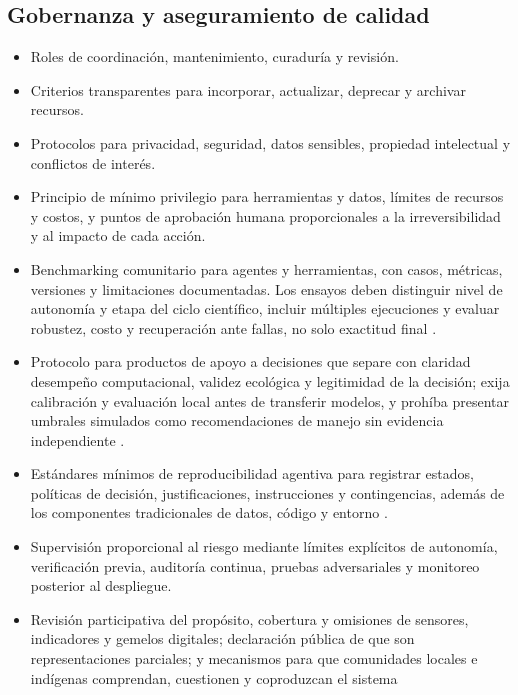 \documentclass[11pt,a4paper]{article}
\begin{document}
\subsection{Gobernanza y aseguramiento de calidad}

\begin{itemize}
  \item Roles de coordinación, mantenimiento, curaduría y revisión.
  \item Criterios transparentes para incorporar, actualizar, deprecar y archivar
  recursos.
  \item Protocolos para privacidad, seguridad, datos sensibles, propiedad
  intelectual y conflictos de interés.
  \item Principio de mínimo privilegio para herramientas y datos, límites de
  recursos y costos, y puntos de aprobación humana proporcionales a la
  irreversibilidad y al impacto de cada acción.
  \item Benchmarking comunitario para agentes y herramientas, con casos,
  métricas, versiones y limitaciones documentadas. Los ensayos deben distinguir
  nivel de autonomía y etapa del ciclo científico, incluir múltiples ejecuciones y
  evaluar robustez, costo y recuperación ante fallas, no solo exactitud final
  \citep{jansen2024discoveryworld,shen2025shortcutsbench}.
  \item Protocolo para productos de apoyo a decisiones que separe con claridad
  desempeño computacional, validez ecológica y legitimidad de la decisión; exija
  calibración y evaluación local antes de transferir modelos, y prohíba presentar
  umbrales simulados como recomendaciones de manejo sin evidencia independiente
  \citep{silvestro2022improving,strannegard2026ecosystem}.
  \item Estándares mínimos de reproducibilidad agentiva para registrar estados,
  políticas de decisión, justificaciones, instrucciones y contingencias, además
  de los componentes tradicionales de datos, código y entorno
  \citep{wei2025agentic}.
  \item Supervisión proporcional al riesgo mediante límites explícitos de
  autonomía, verificación previa, auditoría continua, pruebas adversariales y
  monitoreo posterior al despliegue.
  \item Revisión participativa del propósito, cobertura y omisiones de sensores,
  indicadores y gemelos digitales; declaración pública de que son
  representaciones parciales; y mecanismos para que comunidades locales e
  indígenas comprendan, cuestionen y coproduzcan el sistema

\end{itemize}
\end{document}
